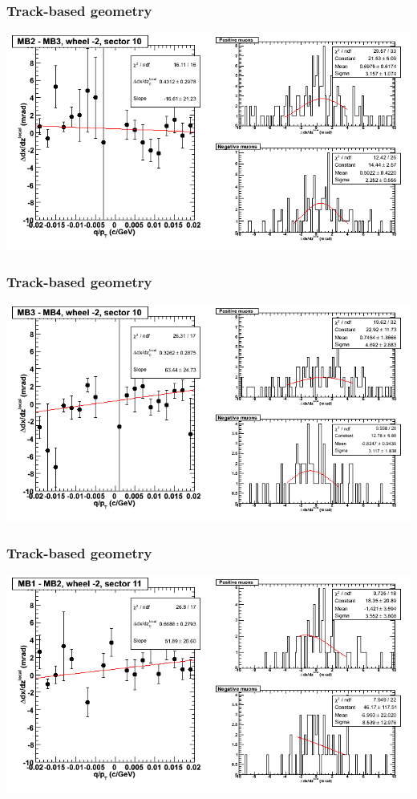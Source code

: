 \documentclass[compress]{beamer}
\begin{document}
\begin{frame}
\frametitle{Track-based geometry}
\includegraphics[width=\linewidth]{NOV4_segdiffs/dt13_slope_A_10_23.png}
\end{frame}

\begin{frame}
\frametitle{Track-based geometry}
\includegraphics[width=\linewidth]{NOV4_segdiffs/dt13_slope_A_10_34.png}
\end{frame}

\begin{frame}
\frametitle{Track-based geometry}
\includegraphics[width=\linewidth]{NOV4_segdiffs/dt13_slope_A_11_12.png}
\end{frame}
\end{document}
